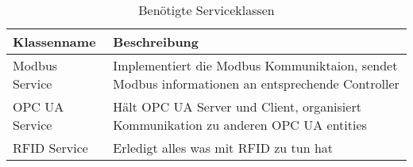 \begin{table}[h]
\centering
\caption{Benötigte Serviceklassen}
\begin{tabularx}{\textwidth}{|l|X|}
\hline
Klassenname & Beschreibung \\
\hline
Modbus Service & Implementiert die Modbus Kommuniktaion, sendet Modbus informationen an entsprechende Controller\\
\hline
OPC UA Service & Hält OPC UA Server und Client, organisiert Kommunikation zu anderen OPC UA entities\\
\hline
RFID Service & Erledigt alles was mit RFID zu tun hat\\
\hline
\end{tabularx}\label{tab:Services}
\end{table}


